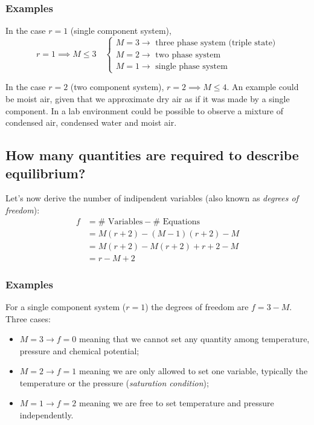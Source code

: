 \subsubsection{Examples}
In the case $r=1$ (single component system),
\begin{equation*}
    r=1 \implies M \le 3 \quad
    \begin{cases}
        M = 3 \to \text{ three phase system (triple state)} \\
        M = 2 \to \text{ two phase system} \\
        M = 1 \to \text{ single phase system}
    \end{cases}
\end{equation*}

In the case $r=2$ (two component system), $r=2 \implies M \le 4$. An example
could be moist air, given that we approximate dry air as if it was made by a
single component. In a lab environment could be possible to observe a mixture of
condensed air, condensed water and moist air.

\subsection{How many quantities are required to describe equilibrium?}
Let’s now derive the number of indipendent variables (also known as
\emph{degrees of freedom}):
\begin{align*}
    f &= \#\text{ Variables} - \#\text{ Equations} \\
    &= M(r+2) - (M-1)(r+2) - M \\
    &= M(r+2) - M(r+2) + r+2 - M \\
    &= r - M + 2
\end{align*}

\subsubsection{Examples}
For a single component system ($r=1$) the degrees of freedom are $f=3-M$. Three
cases:
\begin{itemize}
    \item $M=3 \to f=0$ meaning that we cannot set any quantity among
    temperature, pressure and chemical potential;
    \item $M=2 \to f=1$ meaning we are only allowed to set one variable,
    typically the temperature or the pressure (\emph{saturation condition});
    \item $M=1 \to f=2$ meaning we are free to set temperature and pressure
    independently.
\end{itemize}

